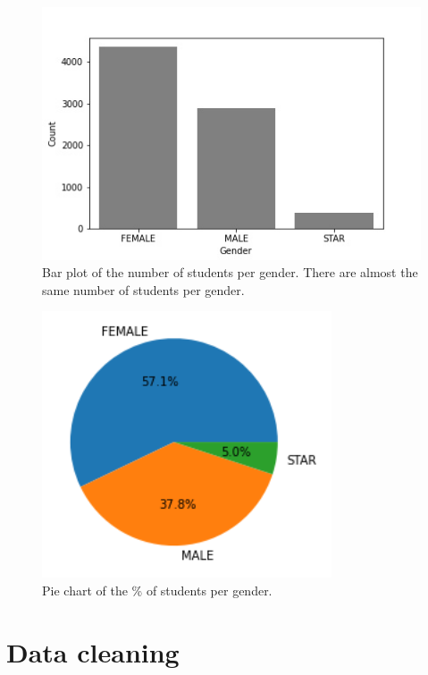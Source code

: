 \documentclass[sigplan,screen]{acmart}
\begin{document}
\begin{figure}
    \centering
    \includegraphics[width=\linewidth]{reports/figures/num_per_gender.jpg}
    \caption{Bar plot of the number of students per gender. There are almost the same number of students per gender.}
    \label{fig:gender}
\end{figure}

\begin{figure}
    \centering
    \includegraphics[width=0.75\linewidth]{reports/figures/pie_chart.png}
    \caption{Pie chart of the \% of students per gender.}
    \label{fig:pie_chart}
\end{figure}

\section{Data cleaning} \label{data:cleaning}
\end{document}
